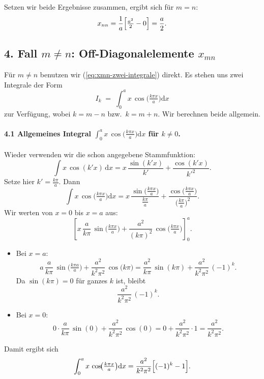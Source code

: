 \documentclass{scrartcl}
\begin{document}
Setzen wir beide Ergebnisse zusammen, ergibt sich für \(m=n\):
\[
x_{nn} 
= \frac{1}{a}\Bigl[\tfrac{a^{2}}{2} - 0\Bigr]
= \frac{a}{2}.
\]

\bigskip

\subsection*{4. Fall \(m \neq n\): Off-Diagonalelemente \(x_{mn}\)}

Für \(m \neq n\) benutzen wir (\ref{eq:xmn-zwei-integrale}) direkt. Es stehen uns zwei Integrale der Form
\[
I_{k} \;=\; \int_{0}^{a} x\,\cos\!\bigl(\tfrac{k\pi x}{a}\bigr)\mathrm{d}x
\]
zur Verfügung, wobei \(k = m-n\) bzw.\ \(k = m+n\). Wir berechnen beide allgemein.

\smallskip

\paragraph{4.1 Allgemeines Integral \(\displaystyle \int_{0}^{a} x\,\cos\!\bigl(\tfrac{k\pi x}{a}\bigr)\mathrm{d}x\) für \(k \neq 0\).} 

Wieder verwenden wir die schon angegebene Stammfunktion:
\[
\int x\,\cos(k' x)\,\mathrm{d}x
= x\,\frac{\sin(k' x)}{k'} + \frac{\cos(k' x)}{k'^{2}}.
\]
Setze hier \(k' = \tfrac{k\pi}{a}\). Dann
\[
\int x\,\cos\!\bigl(\tfrac{k\pi x}{a}\bigr)\mathrm{d}x
= x\,\frac{\sin\bigl(\tfrac{k\pi x}{a}\bigr)}{\tfrac{k\pi}{a}}
+ \frac{\cos\bigl(\tfrac{k\pi x}{a}\bigr)}{\bigl(\tfrac{k\pi}{a}\bigr)^{2}}.
\]
Wir werten von \(x=0\) bis \(x=a\) aus:
\[
\left[x\,\frac{a}{k\pi}\,\sin\!\bigl(\tfrac{k\pi x}{a}\bigr)
+ \frac{a^{2}}{(k\pi)^{2}}\,\cos\!\bigl(\tfrac{k\pi x}{a}\bigr)\right]_{0}^{a}.
\]
\begin{itemize}
  \item Bei \(x = a\): 
  \[
  a\,\frac{a}{k\pi}\,\sin\!\bigl(\tfrac{k\pi a}{a}\bigr)
  + \frac{a^{2}}{k^{2}\pi^{2}}\,\cos\!\bigl(k\pi\bigr)
  = \frac{a^{2}}{k\pi}\,\sin(k\pi) 
  + \frac{a^{2}}{k^{2}\pi^{2}}\,(-1)^{k}.
  \]
  Da \(\sin(k\pi) = 0\) für ganzes \(k\) ist, bleibt
  \[
  \frac{a^{2}}{k^{2}\pi^{2}}\,(-1)^{k}.
  \]
  \item Bei \(x = 0\): 
  \[
  0\cdot\frac{a}{k\pi}\,\sin(0) 
  + \frac{a^{2}}{k^{2}\pi^{2}}\,\cos(0)
  = 0 + \frac{a^{2}}{k^{2}\pi^{2}}\cdot 1 
  = \frac{a^{2}}{k^{2}\pi^{2}}.
  \]
\end{itemize}
Damit ergibt sich
\[
\int_{0}^{a} x\,\cos\!\bigl(\tfrac{k\pi x}{a}\bigr)\mathrm{d}x
= \frac{a^{2}}{k^{2}\pi^{2}}\Bigl[(-1)^{k} - 1\Bigr].
\]
\end{document}
